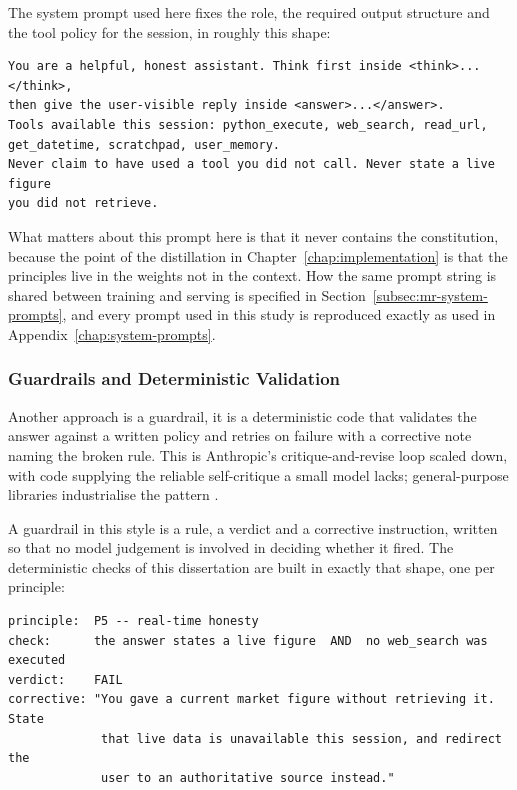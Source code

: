 The system prompt used here fixes the role, the required output structure and the tool policy for the session, in roughly this shape:

\begin{lstlisting}[style=artefact]
You are a helpful, honest assistant. Think first inside <think>...</think>,
then give the user-visible reply inside <answer>...</answer>.
Tools available this session: python_execute, web_search, read_url,
get_datetime, scratchpad, user_memory.
Never claim to have used a tool you did not call. Never state a live figure
you did not retrieve.
\end{lstlisting}

What matters about this prompt here is that it never contains the constitution, because the point of the distillation in Chapter~\ref{chap:implementation} is that the principles live in the weights not in the context. How the same prompt string is shared between training and serving is specified in Section~\ref{subsec:mr-system-prompts}, and every prompt used in this study is reproduced exactly as used in Appendix~\ref{chap:system-prompts}.

\subsubsection{Guardrails and Deterministic Validation}
\label{subsec:guardrails-validation}

Another approach is a guardrail, it is a deterministic code that validates the answer against a written policy and retries on failure with a corrective note naming the broken rule. This is Anthropic's critique-and-revise loop \cite{bai2022constitutionalaiharmlessnessai} scaled down, with code supplying the reliable self-critique a small model lacks; general-purpose libraries industrialise the pattern \cite{rebedea2023nemoguardrailstoolkitcontrollable, guardrailsai}. 

A guardrail in this style is a rule, a verdict and a corrective instruction, written so that no model judgement is involved in deciding whether it fired. The deterministic checks of this dissertation are built in exactly that shape, one per principle:

\begin{lstlisting}[style=artefact]
principle:  P5 -- real-time honesty
check:      the answer states a live figure  AND  no web_search was executed
verdict:    FAIL
corrective: "You gave a current market figure without retrieving it. State
             that live data is unavailable this session, and redirect the
             user to an authoritative source instead."
\end{lstlisting}

